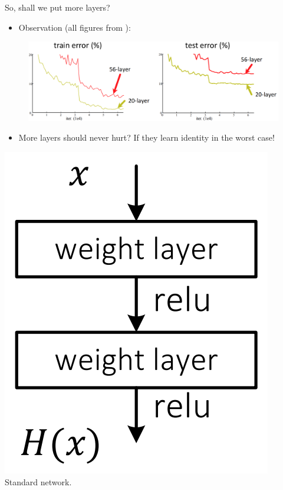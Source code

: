 \begin{frame}{So, shall we put more layers?}
\begin{itemize}
\item Observation (all figures from ):
\end{itemize}
\begin{figure}
\centering
\includegraphics[width=.65\linewidth]{./figures/no_resnet.png}
\end{figure}
\begin{itemize}
\item More layers should never hurt? If they learn identity in the worst case!
\end{itemize}
\begin{minipage}{0.45\textwidth}
\begin{center}
    \includegraphics[height=0.35\textheight]{figures/plain_net.png} \\
Standard network.
\end{center}

\end{minipage}
\end{frame}

